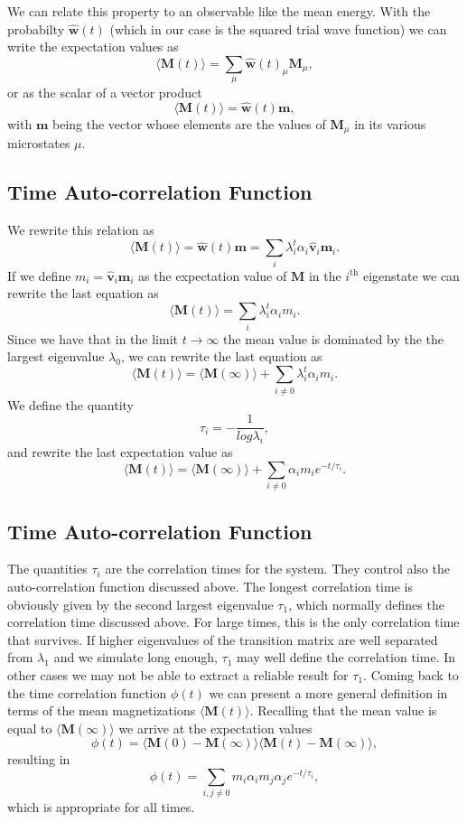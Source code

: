 \documentclass[%
oneside,                 %
final,                   %
10pt]{article}
\begin{document}
We can relate this property to an observable like the mean energy.
With the probabilty $\mathbf{\hat{w}}(t)$ (which in our case is the squared trial wave function) we
can write the expectation values as 
\[
 \langle \mathbf{M}(t) \rangle  = \sum_{\mu} \mathbf{\hat{w}}(t)_{\mu}\mathbf{M}_{\mu},
\] 
or as the scalar of a  vector product
 \[
 \langle \mathbf{M}(t) \rangle  = \mathbf{\hat{w}}(t)\mathbf{m},
\] 
with $\mathbf{m}$ being the vector whose elements are the values of $\mathbf{M}_{\mu}$ in its 
various microstates $\mu$.

\subsection*{Time Auto-correlation Function}

We rewrite this relation  as
 \[
 \langle \mathbf{M}(t) \rangle  = \mathbf{\hat{w}}(t)\mathbf{m}=\sum_i\lambda_i^t\alpha_i\mathbf{\hat{v}}_i\mathbf{m}_i.
\] 
If we define $m_i=\mathbf{\hat{v}}_i\mathbf{m}_i$ as the expectation value of
$\mathbf{M}$ in the $i^{\mathrm{th}}$ eigenstate we can rewrite the last equation as
 \[
 \langle \mathbf{M}(t) \rangle  = \sum_i\lambda_i^t\alpha_im_i.
\] 
Since we have that in the limit $t\rightarrow \infty$ the mean value is dominated by the 
the largest eigenvalue $\lambda_0$, we can rewrite the last equation as
 \[
 \langle \mathbf{M}(t) \rangle  = \langle \mathbf{M}(\infty) \rangle+\sum_{i\ne 0}\lambda_i^t\alpha_im_i.
\] 
We define the quantity
\[
   \tau_i=-\frac{1}{log\lambda_i},
\]
and rewrite the last expectation value as
 \[
 \langle \mathbf{M}(t) \rangle  = \langle \mathbf{M}(\infty) \rangle+\sum_{i\ne 0}\alpha_im_ie^{-t/\tau_i}.
\label{eq:finalmeanm}
\] 

\subsection*{Time Auto-correlation Function}

The quantities $\tau_i$ are the correlation times for the system. They control also the auto-correlation function 
discussed above.  The longest correlation time is obviously given by the second largest
eigenvalue $\tau_1$, which normally defines the correlation time discussed above. For large times, this is the 
only correlation time that survives. If higher eigenvalues of the transition matrix are well separated from 
$\lambda_1$ and we simulate long enough,  $\tau_1$ may well define the correlation time. 
In other cases we may not be able to extract a reliable result for $\tau_1$. 
Coming back to the time correlation function $\phi(t)$ we can present a more general definition in terms
of the mean magnetizations $ \langle \mathbf{M}(t) \rangle$. Recalling that the mean value is equal 
to $ \langle \mathbf{M}(\infty) \rangle$ we arrive at the expectation values
\[
\phi(t) =\langle \mathbf{M}(0)-\mathbf{M}(\infty)\rangle \langle \mathbf{M}(t)-\mathbf{M}(\infty)\rangle,
\]
resulting in
\[
\phi(t) =\sum_{i,j\ne 0}m_i\alpha_im_j\alpha_je^{-t/\tau_i},
\]
which is appropriate for all times.
\end{document}
